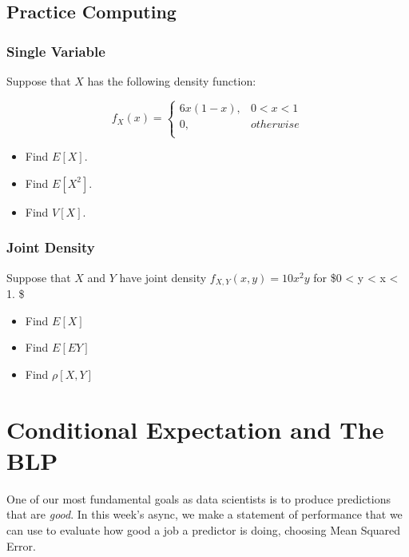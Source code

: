 \documentclass[
]{book}
\providecommand{\tightlist}{%
  \setlength{\itemsep}{0pt}\setlength{\parskip}{0pt}}
\theoremstyle{definition}
\theoremstyle{definition}
\theoremstyle{definition}
\theoremstyle{definition}
\theoremstyle{remark}
\begin{document}
\hypertarget{practice-computing}{%
\section{Practice Computing}\label{practice-computing}}

\hypertarget{single-variable}{%
\subsection{Single Variable}\label{single-variable}}

Suppose that \(X\) has the following density function:

\[ 
  f_{X}(x) = \begin{cases} 
    6x(1 - x), & 0 < x < 1 \\ 
    0, & otherwise \\ 
  \end{cases}
\]

\begin{itemize}
\tightlist
\item
  Find \(E[X]\).
\item
  Find \(E[X^2]\).
\item
  Find \(V[X]\).
\end{itemize}

\hypertarget{joint-density-1}{%
\subsection{Joint Density}\label{joint-density-1}}

Suppose that \(X\) and \(Y\) have joint density \(f_{X,Y}(x,y) = 10 x^2y\) for \$0 \textless{} y \textless{} x \textless{} 1. \$

\begin{itemize}
\tightlist
\item
  Find \(E[X]\)
\item
  Find \(E[EY]\)
\item
  Find \(\rho[X,Y]\)
\end{itemize}

\hypertarget{conditional-expectation-and-the-blp}{%
\chapter{Conditional Expectation and The BLP}\label{conditional-expectation-and-the-blp}}

One of our most fundamental goals as data scientists is to produce predictions that are \emph{good}. In this week's async, we make a statement of performance that we can use to evaluate how good a job a predictor is doing, choosing Mean Squared Error.
\end{document}
